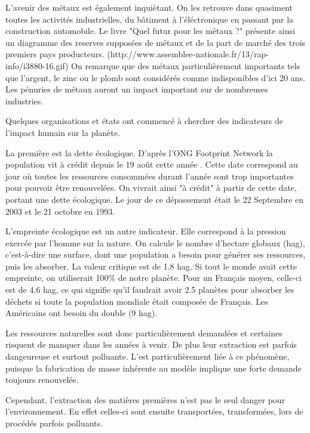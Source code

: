 L'avenir des métaux est également inquiètant. On les retrouve dans quasiment toutes les activités industrielles, du bâtiment à l'éléctronique en passant par la construction automobile. Le livre "Quel futur pour les métaux ?" \cite{LivreFuturMetaux} présente ainsi un diagramme des reserves supposées de métaux et de la part de marché des trois premiers pays producteurs.
(http://www.assemblee-nationale.fr/13/rap-info/i3880-16.gif)
On remarque que des métaux particulièrement importants tels que l'argent, le zinc ou le plomb sont considérés comme indisponibles d'ici 20 ans. Les pénuries de métaux auront un impact important sur de nombreuses industries. 


\smallbreak Quelques organisations et états ont commencé à chercher des indicateurs de l'impact humain sur la planète.

La première est la dette écologique. D'après l'ONG Footprint Network la population vit à crédit depuis le 19 août cette année \cite{DateACredit}. Cette date correspond au jour où toutes les ressources consommées durant l'année sont trop importantes pour pouvoir être renouvelées. On vivrait ainsi "à crédit" à partir de cette date, portant une dette écologique. Le jour de ce dépassement était le 22 Septembre en 2003 et le 21 octobre en 1993.

L'empreinte écologique est un autre indicateur. Elle correspond à la pression exercée par l'homme sur la nature. On calcule le nombre d'hectare globaux (hag), c'est-à-dire une surface, dont une population a besoin pour générer ses ressources, puis les absorber. La valeur critique est de 1.8 hag. Si tout le monde avait cette empreinte, on utiliserait 100\% de notre planète. Pour un Français moyen, celle-ci est de 4.6 hag, ce qui signifie qu'il faudrait avoir 2.5 planètes pour absorber les déchets si toute la population mondiale était composée de Français. Les Américains ont besoin du double (9 hag).

\smallbreak Les ressources naturelles sont donc particulièrement demandées et certaines risquent de manquer dans les années à venir. De plus leur extraction est parfois dangeureuse et surtout polluante. L'\op est particulièrement liée à ce phénomène, puisque la fabrication de masse inhérente au modèle implique une forte demande toujours renouvelée. 

Cependant, l'extraction des matières premières n'est pas le seul danger pour l'environnement. En effet celles-ci sont ensuite transportées, transformées, lors de procédés parfois polluants.






